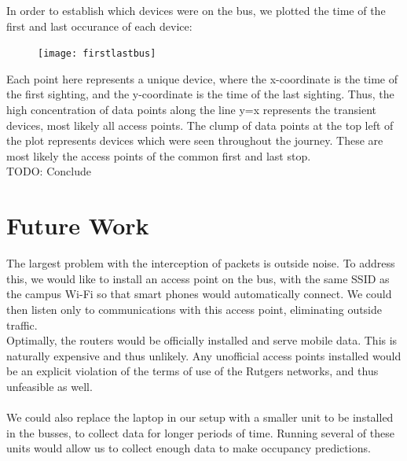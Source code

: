 \documentclass[letterpaper,abstract=on,titlepage=false]{scrreprt}
\begin{document}
	In order to establish which devices were on the bus, we plotted the time of the first and last occurance of each device:


	\begin{figure}[H]
	\texttt{[image: firstlastbus]}
	\centering
	\end{figure}

	Each point here represents a unique device, where the x-coordinate is the time of the first sighting, and the y-coordinate is the time of the last sighting.
	Thus, the high concentration of data points along the line y=x represents the transient devices, most likely all access points.
	The clump of data points at the top left of the plot represents devices which were seen throughout the journey. These are most likely the access points of the common first and last stop.
	\\

	TODO: Conclude


\section*{Future Work}
The largest problem with the interception of packets is outside noise.
To address this, we would like to install an access point on the bus, with the same SSID as the campus Wi-Fi so that smart phones would automatically connect.
We could then listen only to communications with this access point, eliminating outside traffic.
\\
Optimally, the routers would be officially installed and serve mobile data. This is naturally expensive and thus unlikely. Any unofficial access points installed would be an explicit violation of the terms of use of the Rutgers networks, and thus unfeasible as well.
\\
\\
We could also replace the laptop in our setup with a smaller unit to be installed in the busses, to collect data for longer periods of time. Running several of these units would allow us to collect enough data to make occupancy predictions.
\end{document}
